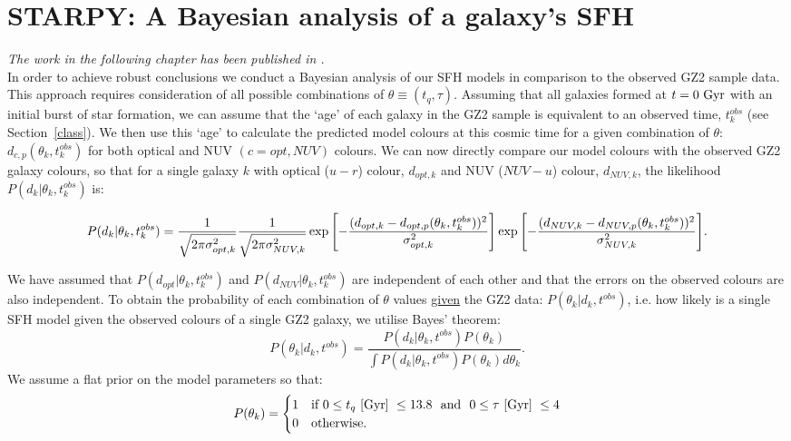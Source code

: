 \chapter{STARPY: A Bayesian analysis of a galaxy's SFH}

\emph{The work in the following chapter has been published in \citet{smethurst15}.}
\\

In order to achieve robust conclusions we conduct a Bayesian analysis \citep{Sivia, MacKay} of our SFH models in comparison to the observed GZ2 sample data. This approach requires consideration of all possible combinations of $\theta \equiv (t_{q}, \tau)$. Assuming that all galaxies formed at $t=0~\rm{Gyr}$ with an initial burst of star formation, we can assume that the `age' of each galaxy in the GZ2 sample is equivalent to an observed time, $t^{obs}_{k}$ (see Section~\ref{class}). We then use this  `age' to calculate the predicted model colours at this cosmic time for a given combination of $\theta$: $d_{c,p}(\theta_k, t^{obs}_{k})$ for both optical and NUV $(c={opt,NUV})$ colours. We can now directly compare our model colours with the observed GZ2 galaxy colours, so that for a single galaxy $k$ with optical ($u-r$) colour, $d_{opt, k}$ and NUV ($NUV-u$) colour, $d_{NUV,k}$, the likelihood $P(d_{k}|\theta_k, t^{obs}_{k})$ is:


\begin{equation}\label{like}
P(d_{k}|\theta_k, t^{obs}_{k}) = \frac{1}{\sqrt{2\pi\sigma_{opt, k}^2}}\frac{1}{\sqrt{2\pi\sigma_{NUV, k}^2}} \\ \exp{\left[ - \frac{(d_{opt, k} - d_{opt, p}(\theta_k, t_{k}^{obs}))^2}{\sigma_{opt, k}^2} \right]} \\ \exp{\left[ - \frac{(d_{NUV, k} - d_{NUV, p}(\theta_k, t_{k}^{obs}))^2}{\sigma_{NUV, k}^2} \right]}.
\end{equation}


We have assumed that $P(d_{opt}|\theta_k, t^{obs}_{k})$ and $P(d_{NUV}|\theta_k, t^{obs}_{k})$ are independent of each other and that the errors on the observed colours are also independent. To obtain the probability of each combination of $\theta$ values \underline{given} the GZ2 data: $P(\theta_k|d_k, t^{obs})$, i.e. how likely is a single SFH model given the observed colours of a single GZ2 galaxy, we utilise Bayes' theorem:
 \begin{equation}\label{big}
P(\theta_k|d_k, t^{obs}) = \frac{P(d_k|\theta_k, t^{obs})P(\theta_k)}{\int P(d_k |\theta_k, t^{obs})P(\theta_k) d\theta_k}.
\end{equation}
We assume a flat prior on the model parameters so that:
\begin{equation}\label{prior}
P(\theta_k) =
\begin{cases}
1 & \text{if } 0 \leq t_q ~\rm{[Gyr]}~ \leq 13.8 ~  \text{ and } ~ 0 \leq \tau  ~\rm{[Gyr]}~ \leq 4\\
0 & \text{otherwise.} \\
\end{cases}
\end{equation}

